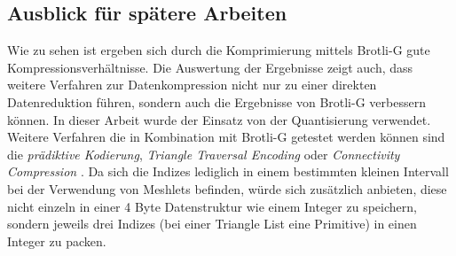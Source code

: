 \subsection{Ausblick für spätere Arbeiten}
\label{subsec:ausblick}
Wie zu sehen ist ergeben sich durch die Komprimierung mittels Brotli-G gute Kompressionsverhältnisse.
Die Auswertung der Ergebnisse zeigt auch, dass weitere Verfahren zur Datenkompression nicht nur zu einer direkten Datenreduktion führen, sondern auch die Ergebnisse von Brotli-G verbessern können.
In dieser Arbeit wurde der Einsatz von der Quantisierung verwendet.
Weitere Verfahren die in Kombination mit Brotli-G getestet werden können sind die \textit{prädiktive Kodierung}, \textit{Triangle Traversal Encoding} oder \textit{Connectivity Compression} \cite{Jakob2017}.
Da sich die Indizes lediglich in einem bestimmten kleinen Intervall bei der Verwendung von Meshlets befinden, würde sich zusätzlich anbieten, diese nicht einzeln in einer 4 Byte Datenstruktur wie einem Integer zu speichern, sondern jeweils drei Indizes (bei einer Triangle List eine Primitive) in einen Integer zu packen. \newline

